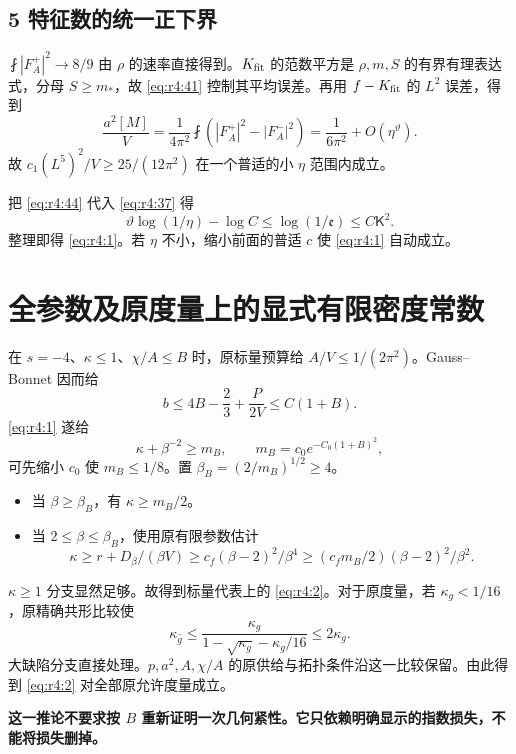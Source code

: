 \documentclass[UTF8,11pt,fontset=none]{ctexart}
\providecommand{\tightlist}{\setlength{\itemsep}{1pt}\setlength{\parskip}{0pt}}
\begin{document}
\subsection{5 特征数的统一正下界}\label{ch4:ux7279ux5f81ux6570ux7684ux7edfux4e00ux6b63ux4e0bux754c}

\(\fint|F_A^+|^2\to8/9\) 由 \(\rho\) 的速率直接得到。\(K_{\rm fit}\) 的范数平方是 \(\rho,m,S\) 的有界有理表达式，分母 \(S\ge m_*\)，故 \eqref{eq:r4:41} 控制其平均误差。再用 \(f-K_{\rm fit}\) 的 \(L^2\) 误差，得到 \[
\frac{a^2[M]}V=\frac1{4\pi^2}\fint\left(|F_A^+|^2-|F_A^-|^2\right)
=\frac1{6\pi^2}+O(\eta^\vartheta).
\] 故 \(c_1(L^5)^2/V\ge25/(12\pi^2)\) 在一个普适的小 \(\eta\) 范围内成立。

把 \eqref{eq:r4:44} 代入 \eqref{eq:r4:37} 得 \[
\vartheta\log(1/\eta)-\log C
\le\log(1/\mathfrak e)\le C\mathsf K^2.
\] 整理即得 \eqref{eq:r4:1}。若 \(\eta\) 不小，缩小前面的普适 \(c\) 使 \eqref{eq:r4:1} 自动成立。

\section{全参数及原度量上的显式有限密度常数}\label{ch4:ux5168ux53c2ux6570ux53caux539fux5ea6ux91cfux4e0aux7684ux663eux5f0fux6709ux9650ux5bc6ux5ea6ux5e38ux6570}

在 \(s=-4\)、\(\kappa\le1\)、\(\chi/A\le B\) 时，原标量预算给 \(A/V\le1/(2\pi^2)\)。Gauss--Bonnet 因而给 \[
b\le4B-\frac23+\frac{P}{2V}\le C(1+B).
\] \eqref{eq:r4:1} 遂给 \[
\kappa+\beta^{-2}\ge m_B,
\qquad m_B=c_0e^{-C_0(1+B)^2},
\tag{4.45}\label{eq:r4:45}
\] 可先缩小 \(c_0\) 使 \(m_B\le1/8\)。置 \(\beta_B=(2/m_B)^{1/2}\ge4\)。

\begin{itemize}
\tightlist
\item
  当 \(\beta\ge\beta_B\)，有 \(\kappa\ge m_B/2\)。
\item
  当 \(2\le\beta\le\beta_B\)，使用原有限参数估计 \[
  \kappa\ge r+D_\beta/(\beta V)
  \ge c_f(\beta-2)^2/\beta^4
  \ge(c_fm_B/2)(\beta-2)^2/\beta^2.
  \]
\end{itemize}

\(\kappa\ge1\) 分支显然足够。故得到标量代表上的 \eqref{eq:r4:2}。对于原度量，若 \(\kappa_g<1/16\)，原精确共形比较使 \[
\kappa_{\widehat g}\le
\frac{\kappa_g}{1-\sqrt{\kappa_g}-\kappa_g/16}\le2\kappa_g.
\] 大缺陷分支直接处理。\(p,a^2,A,\chi/A\) 的原供给与拓扑条件沿这一比较保留。由此得到 \eqref{eq:r4:2} 对全部原允许度量成立。

\textbf{这一推论不要求按 \(B\) 重新证明一次几何紧性。它只依赖明确显示的指数损失，不能将损失删掉。}
\end{document}
